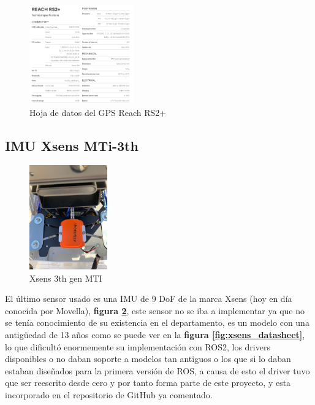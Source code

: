 \begin{figure}[H]
    \centering
    \includegraphics[width=0.4\textwidth]{images/reach_datasheet.png}
    \caption{Hoja de datos del GPS Reach RS2+}
    \label{fig:datasheet_reach}
\end{figure}



\subsection{IMU Xsens MTi-3th}
\begin{figure}[H]
    \centering
    \includegraphics[width=0.3\textwidth]{images/xsens.jpeg}
    \caption{Xsens 3th gen MTI}
    \label{fig:xsens_imu}
\end{figure}
El último sensor usado es una IMU de 9 DoF de la marca Xsens (hoy en día conocida por Movella), 
\textbf{figura \ref{fig:xsens_imu}}, este sensor no se iba a implementar ya que no se tenía conocimiento de su existencia en el 
departamento, es un modelo con una antigüedad de 13 años como se puede ver en la \textbf{figura \ref{fig:xsens_datasheet}}, lo que dificultó enormemente su implementación con ROS2, los drivers 
disponibles o no daban soporte a modelos tan antiguos o los que si lo daban estaban diseñados para la primera versión de ROS, a causa de 
esto el driver tuvo que ser reescrito desde cero y por tanto forma parte de este proyecto, y esta incorporado en el repositorio de GitHub 
ya comentado.  


